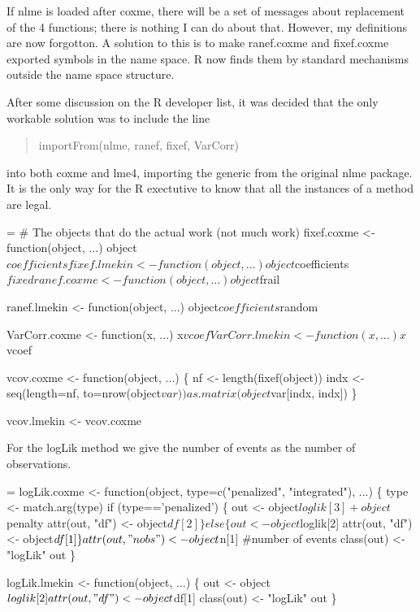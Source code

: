 \documentclass{article}
\begin{document}
If nlme is loaded after coxme, there will be a set of messages about
replacement of the 4 functions; there is nothing I can do about
that.  
However, my definitions are now forgotton.  A solution to this is to
make ranef.coxme and fixef.coxme exported symbols in the name space.
R now finds them by standard mechanisms outside the name space structure.

After some discussion on the R developer list, it was decided that the
only workable solution was to include the line
\begin{quote}
   importFrom(nlme, ranef, fixef, VarCorr)
\end{quote}
into both coxme and lme4, importing the generic from the original nlme
package.  It is the only way for the R exectutive to know that all the
instances of a method are legal.

\begin{nwchunk}
=
 # The objects that do the actual work (not much work)
 fixef.coxme <- function(object, ...)
     object$coefficients
 
 fixef.lmekin <- function(object, ...)
     object$coefficients$fixed
 
 ranef.coxme <- function(object, ...)
     object$frail
 
 ranef.lmekin <- function(object, ...)
     object$coefficients$random
 
 VarCorr.coxme <- function(x, ...) 
     x$vcoef
     
 VarCorr.lmekin <- function(x, ...) 
     x$vcoef
 
 vcov.coxme <- function(object, ...) \{
     nf <- length(fixef(object))
     indx <- seq(length=nf, to=nrow(object$var))
     as.matrix(object$var[indx, indx])
 \}
 
 vcov.lmekin <- vcov.coxme  
\end{nwchunk}

For the logLik method we give the number of events as the number of
observations.  
\begin{nwchunk}
=
 logLik.coxme <- function(object, type=c("penalized", "integrated"), ...) \{
     type <- match.arg(type)
     if (type=='penalized') \{
         out <- object$loglik[3] + object$penalty
         attr(out, "df") <- object$df[2]
         \}
     else \{
         out <- object$loglik[2]
         attr(out, "df") <- object$df[1]
         \}
     attr(out, "nobs") <- object$n[1]  #number of events
     class(out) <- "logLik"
     out
 \}
 
 logLik.lmekin <- function(object, ...) \{
     out <- object$loglik[2]
     attr(out, "df") <- object$df[1]
     class(out) <- "logLik"
     out
     \}
\end{nwchunk}
\end{document}
